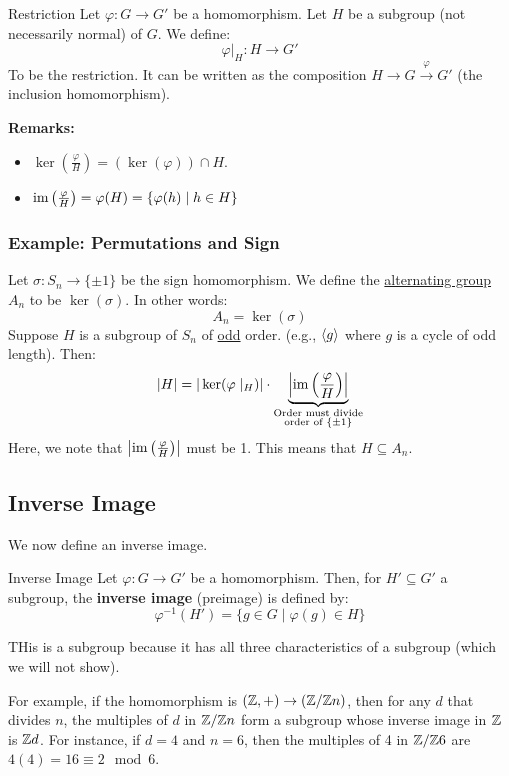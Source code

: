 \documentclass[letterpaper]{article}
\begin{document}
\begin{definition}{Restriction}{}
    Let $\varphi: G \to G'$ be a homomorphism. Let $H$ be a subgroup (not necessarily normal) of $G$. We define: 
    \[\varphi |_{H}: H \to G'\]
    To be the restriction. It can be written as the composition $H \to G \xrightarrow{\varphi} G'$ (the inclusion homomorphism). 
\end{definition}
\textbf{Remarks:}
\begin{itemize}
    \item $\ker\left(\frac{\varphi}{H}\right) = (\ker(\varphi)) \cap H$.
    \item $\operatorname{im}\left(\frac{\varphi}{H}\right) = \varphi(H) = \{\varphi(h) \mid h \in H\}$
\end{itemize}

\subsubsection{Example: Permutations and Sign}
Let $\sigma: S_n \to \{\pm 1\}$ be the sign homomorphism. We define the \underline{alternating group} $A_n$ to be $\ker(\sigma)$. In other words:
\[A_n = \ker(\sigma)\]
Suppose $H$ is a subgroup of $S_n$ of \underline{odd} order. (e.g., $\langle g \rangle$ where $g$ is a cycle of odd length). Then: 
\[|H| = |\ker(\varphi \mid_H)| \cdot \underbrace{\left|\operatorname{im}\left(\frac{\varphi}{H}\right)\right|}_{\substack{\text{Order must divide} \\ \text{order of } \{\pm 1\}}}\]
Here, we note that $\left|\operatorname{im}\left(\frac{\varphi}{H}\right)\right|$ must be 1. This means that $H \subseteq A_n$. 

\subsection{Inverse Image}
We now define an inverse image.
\begin{definition}{Inverse Image}{}
    Let $\varphi: G \to G'$ be a homomorphism. Then, for $H' \subseteq G'$ a subgroup, the \textbf{inverse image} (preimage) is defined by: 
\[\varphi^{-1}(H') = \{g \in G \mid \varphi(g) \in H\}\]
\end{definition}
THis is a subgroup because it has all three characteristics of a subgroup (which we will not show). 

\bigskip

For example, if the homomorphism is $(\mathbb{Z}, +) \to (\mathbb{Z} / \mathbb{Z} n)$, then for any $d$ that divides $n$, the multiples of $d$ in $\mathbb{Z} / \mathbb{Z} n$ form a subgroup whose inverse image in $\mathbb{Z}$ is $\mathbb{Z} d$. For instance, if $d = 4$ and $n = 6$, then the multiples of 4 in $\mathbb{Z} / \mathbb{Z} 6$ are $4(4) = 16 \equiv 2 \mod{6}$. 
\end{document}

